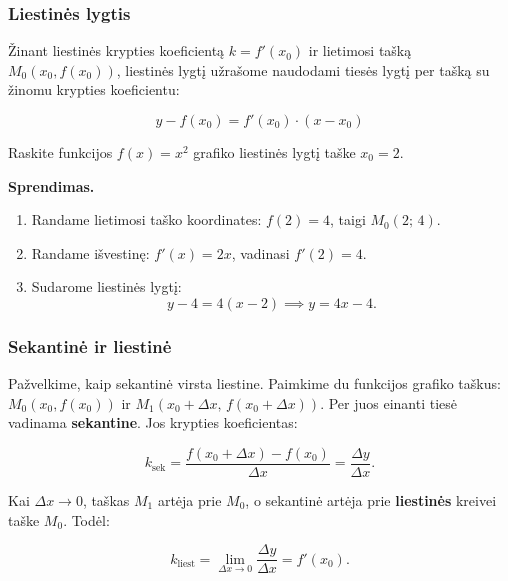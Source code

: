 \subsubsection*{Liestinės lygtis}

Žinant liestinės krypties koeficientą $k = f'(x_0)$ ir lietimosi tašką $M_0(x_0, f(x_0))$, liestinės lygtį užrašome naudodami tiesės lygtį per tašką su žinomu krypties koeficientu:

\[
\boxed{y - f(x_0) = f'(x_0)\cdot(x - x_0)}
\]

\begin{example}
Raskite funkcijos $f(x) = x^2$ grafiko liestinės lygtį taške $x_0 = 2$.

\textbf{Sprendimas.}
\begin{enumerate}
    \item Randame lietimosi taško koordinates: $f(2) = 4$, taigi $M_0(2;\,4)$.
    \item Randame išvestinę: $f'(x) = 2x$, vadinasi $f'(2) = 4$.
    \item Sudarome liestinės lygtį:
    \[
    y - 4 = 4(x - 2) \implies y = 4x - 4.
    \]
\end{enumerate}
\end{example}

\subsubsection*{Sekantinė ir liestinė}

Pažvelkime, kaip sekantinė virsta liestine. Paimkime du funkcijos grafiko taškus: $M_0(x_0, f(x_0))$ ir $M_1(x_0+\Delta x,\, f(x_0+\Delta x))$. Per juos einanti tiesė vadinama \textbf{sekantine}. Jos krypties koeficientas:

\[
k_{\text{sek}} = \frac{f(x_0 + \Delta x) - f(x_0)}{\Delta x} = \frac{\Delta y}{\Delta x}.
\]

Kai $\Delta x \to 0$, taškas $M_1$ artėja prie $M_0$, o sekantinė artėja prie \textbf{liestinės} kreivei taške $M_0$. Todėl:

\[
k_{\text{liest}} = \lim_{\Delta x \to 0} \frac{\Delta y}{\Delta x} = f'(x_0).
\]

